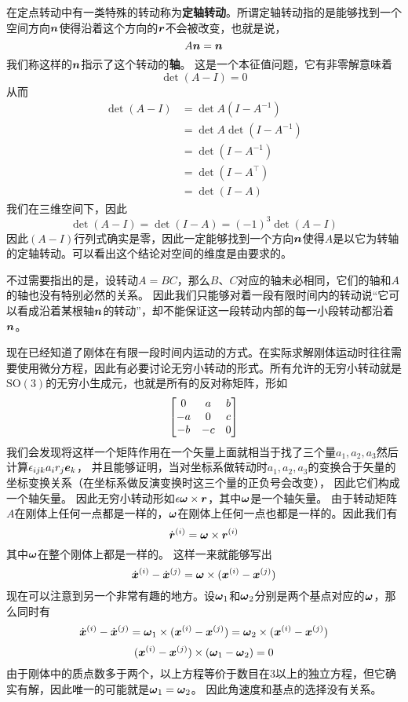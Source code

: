 \documentclass[UTF8, a4paper]{ctexart}
\newcommand*{\sogroup}[1]{\mathrm{SO}(#1)}
\begin{document}
在定点转动中有一类特殊的转动称为\textbf{定轴转动}。所谓定轴转动指的是能够找到一个空间方向$\vb*{n}$使得沿着这个方向的$\vb*{r}$不会被改变，也就是说，
\[
    A \vb*{n} = \vb*{n}
\]
我们称这样的$\vb*{n}$指示了这个转动的\textbf{轴}。
这是一个本征值问题，它有非零解意味着
\[
    \det (A - I) = 0
\]
从而
\[
    \begin{aligned}
        \det (A - I) &= \det A(I - A^{-1}) \\
        &= \det A \det (I - A^{-1}) \\
        &= \det (I - A^{-1}) \\
        &= \det (I - A^\top) \\
        &= \det (I - A)
    \end{aligned}
\]
我们在三维空间下，因此
\[
    \det (A - I) = \det (I - A) = (-1)^3 \det (A - I)
\]
因此$(A-I)$行列式确实是零，因此一定能够找到一个方向$\vb*{n}$使得$A$是以它为转轴的定轴转动。可以看出这个结论对空间的维度是由要求的。

不过需要指出的是，设转动$A=BC$，那么$B$、$C$对应的轴未必相同，它们的轴和$A$的轴也没有特别必然的关系。
因此我们只能够对着一段有限时间内的转动说“它可以看成沿着某根轴$\vb*{n}$的转动”，却不能保证这一段转动内部的每一小段转动都沿着$\vb*{n}$。

现在已经知道了刚体在有限一段时间内运动的方式。在实际求解刚体运动时往往需要使用微分方程，因此有必要讨论无穷小转动的形式。所有允许的无穷小转动就是$\sogroup{3}$的无穷小生成元，也就是所有的反对称矩阵，形如
\[
    \bmqty{0 & a & b \\ -a & 0 & c \\ -b & -c & 0}
\]
我们会发现将这样一个矩阵作用在一个矢量上面就相当于找了三个量$a_1, a_2, a_3$然后计算$\epsilon_{ijk} a_i r_j \vb*{e}_k$，
并且能够证明，当对坐标系做转动时$a_1, a_2, a_3$的变换合于矢量的坐标变换关系（在坐标系做反演变换时这三个量的正负号会改变），
因此它们构成一个轴矢量。
因此无穷小转动形如$\epsilon \vb*{\omega} \times \vb*{r}$，其中$\vb*{\omega}$是一个轴矢量。
由于转动矩阵$A$在刚体上任何一点都是一样的，$\vb*{\omega}$在刚体上任何一点也都是一样的。因此我们有
\begin{equation}
    \dot{\vb*{r}}^{(i)} = \vb*{\omega} \times \vb*{r}^{(i)}
    \label{eq:body-frame-motion}
\end{equation}
其中$\vb*{\omega}$在整个刚体上都是一样的。
这样一来就能够写出
\begin{equation}
    \dot{\vb*{x}}^{(i)} - \dot{\vb*{x}}^{(j)} = \vb*{\omega} \times (\vb*{x}^{(i)} - \vb*{x}^{(j)})
\end{equation}
现在可以注意到另一个非常有趣的地方。设$\vb*{\omega}_1$和$\vb*{\omega}_2$分别是两个基点对应的$\vb*{\omega}$，那么同时有
\[
    \dot{\vb*{x}}^{(i)} - \dot{\vb*{x}}^{(j)} = \vb*{\omega}_1 \times (\vb*{x}^{(i)} - \vb*{x}^{(j)}) = \vb*{\omega}_2 \times (\vb*{x}^{(i)} - \vb*{x}^{(j)})
\]
\[
    (\vb*{x}^{(i)} - \vb*{x}^{(j)}) \times (\vb*{\omega}_1 - \vb*{\omega}_2) = 0
\]
由于刚体中的质点数多于两个，以上方程等价于数目在3以上的独立方程，但它确实有解，因此唯一的可能就是$\vb*{\omega}_1 = \vb*{\omega}_2$。
因此角速度和基点的选择没有关系。
\end{document}
